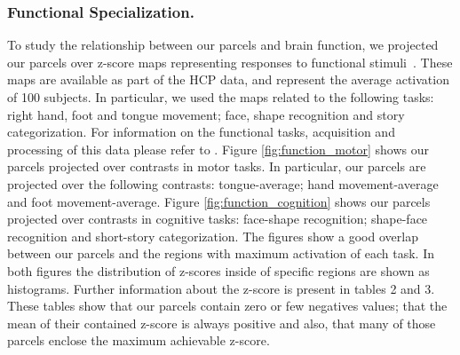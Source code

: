 \subsubsection{Functional Specialization.}
%
To study the relationship between our parcels and brain function, we projected our 
parcels over z-score maps representing responses to functional 
stimuli~\citep{Barch2013}. These maps are available as part of the HCP data, 
and represent the average activation of 100 subjects. In particular, we used
the maps related to 
the following tasks: right hand, foot and tongue movement; face, shape
recognition  and story categorization. For information on the functional tasks,
acquisition and processing of this data please refer to \citet{Barch2013}. 
Figure \ref{fig:function_motor} shows our parcels projected over contrasts
in motor tasks. In particular, our parcels are projected over the following
contrasts: tongue-average; hand movement-average and foot movement-average. 
Figure \ref{fig:function_cognition} shows our parcels projected over contrasts
in cognitive tasks: face-shape recognition; shape-face recognition and short-story
categorization. The figures show a good overlap between our parcels and the
regions with maximum activation of each task. In both figures the distribution
of z-scores inside of specific regions are shown as histograms. Further 
information about the z-score is present in tables 2 and 3. These tables show
that our parcels contain zero or few negatives values; that the mean of their
contained z-score is always positive and also, that many of those parcels 
enclose the maximum achievable z-score.

